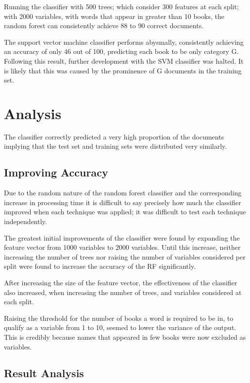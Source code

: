 \documentclass[11pt]{article}
\begin{document}
Running the classifier with 500 trees; which consider 300 features at each
split; with 2000 variables, with words that appear in greater than 10 books, the
random forest can consistently achieve 88 to 90 correct documents.

The support vector machine classifier performs abysmally, consistently achieving
an accuracy of only 46 out of 100, predicting each book to be only category G.
Following this result, further development with the SVM classifier was halted.
It is likely that this was caused by the prominence of G documents in the
training set.

\section{Analysis}

The classifier correctly predicted a very high proportion of the documents
implying that the test set and training sets were distributed very similarly.

\subsection{Improving Accuracy}

Due to the random nature of the random forest classifier and the corresponding
increase in processing time it is difficult to say precisely how much the
classifier improved when each technique was applied; it was difficult to test
each technique independently.

The greatest initial improvements of the classifier were found by expanding the
feature vector from 1000 variables to 2000 variables. Until this increase,
neither increasing the number of trees nor raising the number of variables
considered per split were found to increase the accuracy of the RF
significantly. 

After increasing the size of the feature vector, the effectiveness of the
classifier also increased, when increasing the number of trees, and variables
considered at each split.

Raising the threshold for the number of books a word is required to be in, to
qualify as a variable from 1 to 10, seemed to lower the variance of the output.
This is credibly because names that appeared in few books were now excluded as
variables.

\subsection{Result Analysis}
\end{document}
